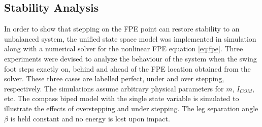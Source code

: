 
\subsection{Stability Analysis} %
\label{sub:overstepping_understepping_simulation}

In order to show that stepping on the FPE point can restore stability to an unbalanced system, the unified state space model was implemented in simulation along with a numerical solver for the nonlinear FPE equation \eqref{eq:fpe}. Three experiments were devised to analyze the behaviour of the system when the swing foot steps exactly on, behind and ahead of the FPE location obtained from the solver. These three cases are labelled perfect, under and over stepping, respectively. The simulations assume arbitrary physical parameters for $m$, $I_{COM}$, etc. The compass biped model with the single state variable is simulated to illustrate the effects of overstepping and under stepping. The leg separation angle $\beta$ is held constant and no energy is lost upon impact. 


